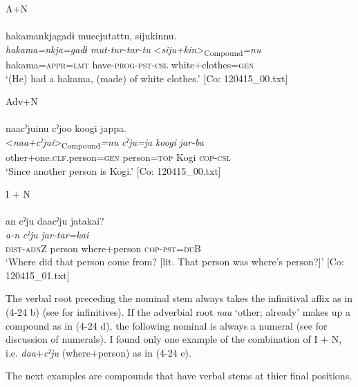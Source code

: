 \ex A+N\\\\
\glll   hakamankjagadɨ  muccjutattu,  sijukinnu.\\
      \textit{hakama=nkja=gadɨ}  \textit{mut-tur-tar-tu}  <\textit{siju+kin}>\textsubscript{Compound}\textit{=nu}\\
      hakama=\textsc{appr}=\textsc{lmt}  have-\textsc{prog}-\textsc{pst}-\textsc{csl}  white+clothes=\textsc{gen}\\
      \glt       ‘(He) had a hakama, (made) of white clothes.’ [Co: 120415\_00.txt]

\ex Adv+N\\\\
\glll     naacˀjuinu  cˀjoo  koogi  jappa.\\
      <\textit{naa+cˀjui}>\textsubscript{Compound}\textit{=nu}  \textit{cˀju=ja}  \textit{koogi}  \textit{jar-ba}\\
      other+one.\textsc{clf}.person=\textsc{gen}  person=\textsc{top}  Kogi  \textsc{cop}-\textsc{csl}\\
      \glt       ‘Since another person is Kogi.’ [Co: 120415\_00.txt]

\ex I + N\\\\
\glll      an  cˀju  daacˀju  jatakai?\\
      \textit{a-n}  \textit{cˀju}  \textit{}  \textit{jar-tar=kai}\\
      \textsc{dist}-\textsc{adn}Z  person  where+person  \textsc{cop}-\textsc{pst}=\textsc{du}B\\
      \glt       ‘Where did that person come from? [lit. That person was where’s person?]’ [Co: 120415\_01.txt]
    \z
\z

The verbal root preceding the nominal stem always takes the infinitival affix as in (4-24 b) (see  for infinitives). If the adverbial root \textit{naa} ‘other; already’ makes up a compound as in (4-24 d), the following nominal is always a numeral (see  for discussion of numerals). I found only one example of the combination of I + N, i.e. \textit{daa}+\textit{cˀju} (where+person) as in (4-24 e).

The next examples are compounds that have verbal stems at thier final positions.

